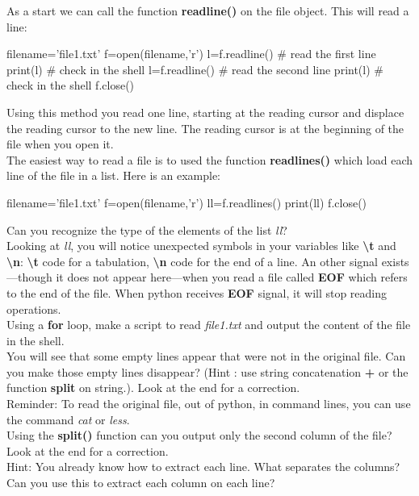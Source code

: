 \documentclass[article,10pt]{scrartcl}
\begin{document}
 As a start we can call the function \textbf{readline()} on the file object. This will read a line:
\begin{python}
filename='file1.txt'
f=open(filename,'r')
l=f.readline() # read the first line
print(l) # check in the shell
l=f.readline() # read the second line
print(l) # check in the shell
f.close()
\end{python}
Using this method you read one line, starting at the reading cursor and displace the reading cursor to the new line. The reading cursor is at the beginning of the file when you open it.\\


The easiest way to read a file is to used the function \textbf{readlines()} which load each line of the file in a list. Here is an example:
\\
\begin{python}
filename='file1.txt'
f=open(filename,'r')
ll=f.readlines()
print(ll)
f.close()
\end{python}
Can you recognize the type of the elements of the list \textit{ll}? \\

Looking at \textit{ll}, you will notice unexpected symbols in your variables like \textbf{\textbackslash t} and \textbf{\textbackslash n}:
 \textbf{\textbackslash t} code for a tabulation, \textbf{\textbackslash n} code for the end of a line. An other signal exists---though it does not appear here---when you read a file called \textbf{EOF} which refers to the end of the file. When python receives \textbf{EOF} signal, it will stop reading operations.
\\

Using a \textbf{for} loop, make a script to read \textit{file1.txt} and output the content of the file in the shell.\\ You will see that some empty lines appear that were not in the original file. Can you make those empty lines disappear? (Hint : use string concatenation \textbf{+} or the function \textbf{split} on string.). Look at the end for a correction.
\\
Reminder: To read the original file, out of python, in command lines, you can use the command \textit{cat} or \textit{less}.
\\


Using the \textbf{split()} function can you output only the second column of the file? Look at the end for a correction.\\
Hint: You already know how to extract each line. What separates the columns? Can you use this to extract each column on each line?\\
\end{document}
